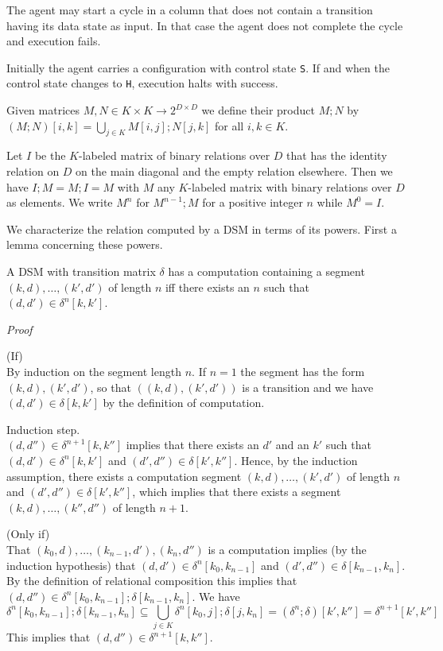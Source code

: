 \documentclass[preprint,11pt]{elsarticle}
\begin{document}
The agent may start a cycle in a column that does
not contain a transition having its data state
as input.
In that case the agent does not complete the cycle
and execution fails.

Initially the agent carries
a configuration with control state {\tt S}.
If and when the control state changes to {\tt H},
execution halts with success.

\begin{definition}\label{def:matMult}
Given matrices $M,N \in K\times K \to 2^{D\times D}$
we define their product $M;N$ by
$
(M;N)[i,k] = \bigcup_{j \in K} M[i,j];N[j,k]
$
for all $i,k \in K$.
\end{definition}

Let $I$ be the $K$-labeled matrix of binary relations
over $D$ that has the identity relation on $D$
on the main diagonal and the empty relation elsewhere.
Then we have $I;M = M;I = M$ with $M$ any $K$-labeled matrix
with binary relations over $D$ as elements.
We write $M^n$ for $M^{n-1};M$ for a positive integer $n$
while $M^0 = I$.

We characterize the relation computed by a DSM
in terms of its powers.
First a lemma concerning these powers.

\begin{lemma}\label{thm:dynLaw}
A DSM with transition matrix $\delta$
has a computation containing
a segment $(k,d),\ldots,(k',d')$ of length $n$
iff there exists an $n$ such that $(d,d') \in \delta^n[k,k']$.
\end{lemma}
\emph{Proof}

(If)\\
By induction on the segment length $n$.
If $n=1$ the segment has the form $(k,d),(k',d')$,
so that 
$((k,d),(k',d'))$ is a transition and we have
$(d,d') \in \delta[k,k']$
by the definition of computation.

Induction step.\\
$(d,d'') \in \delta^{n+1}[k,k'']$
implies that there exists an $d'$ and an $k'$ such that
$(d,d') \in \delta^n[k,k']$ and
$(d',d'') \in \delta[k',k'']$.
Hence, by the induction assumption,
there exists a computation segment
$(k,d),\ldots,(k',d')$ of length $n$
and $(d',d'') \in \delta[k',k'']$,
which implies
that there exists a segment
$(k,d),\ldots,(k'',d'')$ of length $n+1$.

(Only if)\\
That $(k_0,d),\ldots,(k_{n-1},d') ,(k_n,d'')$
is a computation implies
(by the induction hypothesis)
that $(d,d') \in \delta^n[k_0,k_{n-1}]$
and $(d',d'') \in \delta[k_{n-1},k_n]$.
By the definition of relational composition this implies that
$(d,d'') \in \delta^n[k_0,k_{n-1}];\delta[k_{n-1},k_n]$.
We have
$$\delta^n[k_0,k_{n-1}];\delta[k_{n-1},k_n]
\subseteq  \bigcup_{j \in K} \delta^n[k_0,j];\delta[j,k_n]
= (\delta^n;\delta)[k',k''] =  \delta^{n+1}[k',k'']
$$
This implies that $(d,d'') \in \delta^{n+1}[k,k'']$.
\end{document}
